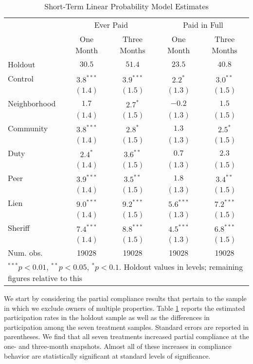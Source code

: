 \documentclass[12pt]{article}
\begin{document}
\begin{table}[ht]
\centering
\caption{Short-Term Linear Probability Model Estimates} \label{pc_lin}
\bigskip
\begin{tabular}{l c c c c }
\hline
 & \multicolumn{2}{c}{Ever Paid} & \multicolumn{2}{c}{Paid in Full} \\
          & One Month & Three Months & One Month & Three Months \\
Holdout   & $30.5$ & $51.4$ & $23.5$ & $40.8$ \\
\hline
Control   & $3.8^{***}$  & $3.9^{***}$  & $2.2^{*}$    & $3.0^{**}$   \\
          & $(1.4)$      & $(1.5)$      & $(1.3)$      & $(1.5)$      \\
Neighborhood & $1.7$        & $2.7^{*}$    & $-0.2$       & $1.5$        \\
          & $(1.4)$      & $(1.5)$      & $(1.3)$      & $(1.5)$      \\
Community     & $3.8^{***}$  & $2.8^{*}$    & $1.3$        & $2.5^{*}$    \\
          & $(1.4)$      & $(1.5)$      & $(1.3)$      & $(1.5)$      \\
Duty      & $2.4^{*}$    & $3.6^{**}$   & $0.7$        & $2.3$        \\
          & $(1.4)$      & $(1.5)$      & $(1.3)$      & $(1.5)$      \\
Peer      & $3.9^{***}$  & $3.5^{**}$   & $1.8$        & $3.4^{**}$   \\
          & $(1.4)$      & $(1.5)$      & $(1.3)$      & $(1.5)$      \\
Lien      & $9.0^{***}$  & $9.2^{***}$  & $5.6^{***}$  & $7.2^{***}$  \\
          & $(1.4)$      & $(1.5)$      & $(1.3)$      & $(1.5)$      \\
Sheriff   & $7.4^{***}$  & $8.8^{***}$  & $4.5^{***}$  & $6.8^{***}$  \\
          & $(1.4)$      & $(1.5)$      & $(1.3)$      & $(1.5)$      \\
\hline
Num. obs. & 19028        & 19028        & 19028        & 19028        \\
\hline
\multicolumn{5}{l}{\scriptsize{$^{***}p<0.01$, $^{**}p<0.05$,
    $^*p<0.1$. Holdout values in levels; remaining figures relative to
    this}}
\end{tabular}
\end{table}

We start by considering the partial compliance results that pertain to
the sample in which we exclude owners of multiple properties.  Table
\ref{pc_lin} reports the estimated participation rates in the holdout
sample as well as the differences in participation among the seven
treatment samples. Standard errors are reported in parentheses. We
find that all seven treatments increased partial compliance at the
one- and three-month snapshots. Almost all of these increases in
compliance behavior are statistically significant at standard levels
of significance.
\end{document}
